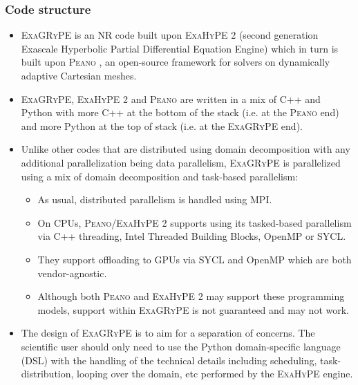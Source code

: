 \documentclass[12pt,a4paper]{article}
\numberwithin{figure}{subsection}
\newcommand{\exagrype}{\textsc{ExaGRyPE}\xspace}
\begin{document}
\subsubsection{Code structure}
\begin{itemize}
    \item \exagrype is an NR code built upon \textsc{ExaHyPE} 2 (second
    generation Exascale Hyperbolic Partial Differential Equation Engine)
    \cite{Reinarz:2020a} which in turn is built upon \textsc{Peano}
    \cite{Weinzierl:2019a}, an open-source framework for solvers on dynamically
    adaptive Cartesian meshes.
    \item \exagrype, \textsc{ExaHyPE} 2 and \textsc{Peano} are written in a mix
    of C++ and Python with more C++ at the bottom of the stack (i.e. at the
    \textsc{Peano} end) and more Python at the top of stack (i.e. at the
    \exagrype end).
    \item Unlike other codes that are distributed using domain decomposition
    with any additional parallelization being data parallelism, \exagrype is
    parallelized using a mix of domain decomposition and task-based parallelism:
       \begin{itemize}
           \item As usual, distributed parallelism is handled using MPI.
           \item On CPUs, \textsc{Peano}/\textsc{ExaHyPE} 2 supports using its
           tasked-based parallelism  via C++ threading, Intel Threaded Building
           Blocks, OpenMP or SYCL.
           \item They support offloading to GPUs via SYCL and OpenMP which are
           both vendor-agnostic.
           \item Although both \textsc{Peano} and \textsc{ExaHyPE} 2 may support
           these programming models, support within \exagrype is not guaranteed
           and may not work.
       \end{itemize}
    \item The design of \exagrype is to aim for a separation of concerns. The
    scientific user should only need to use the Python domain-specific language
    (DSL) with the handling of the technical details including scheduling,
    task-distribution, looping over the domain, etc performed by the
    \textsc{ExaHyPE} engine.
\end{itemize}
\end{document}
